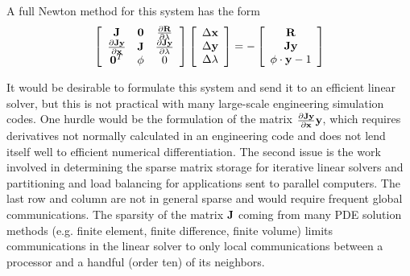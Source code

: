 A full Newton method for this system has the form
\begin{equation}
\label{eq:tpn}
\left[\begin{array}{ccc}
{\bf J} & {\bf 0} & \frac{\partial {\bf R}}{\partial \lambda} \\
\frac{\partial {\bf J} {\bf y}}{\partial {\bf x}} & {\bf J} & \frac{\partial {\bf J} {\bf y}}{\partial \lambda} \\
{\bf 0}^T & \phi & 0 
\end{array}\right]
\left[\begin{array}{c}
\Delta{\bf x} \\
\Delta{\bf y} \\
\Delta\lambda
\end{array}\right]
= -
\left[\begin{array}{c}
{\bf R} \\
{\bf J} {\bf y} \\
\phi \cdot {\bf y} - 1
\end{array}\right]
\end{equation}

It would be desirable to formulate this system and send it to an efficient linear solver, but this is not practical with many large-scale engineering simulation codes. One hurdle would be the formulation of the matrix $\frac{\partial {\bf J} {\bf y}}{\partial {\bf x}} {\bf y}$, which requires derivatives not normally calculated in an engineering code and does not lend itself well to efficient numerical differentiation. The second issue is the work involved in determining the sparse matrix storage for iterative linear solvers and partitioning and load balancing for applications sent to parallel computers. The last row and column are not in general sparse and would require frequent global communications. The sparsity of the matrix ${\bf J}$ coming from many PDE solution methods (e.g. finite element, finite difference, finite volume) limits communications in the linear solver to only local communications between a processor and a handful (order ten) of its neighbors.

